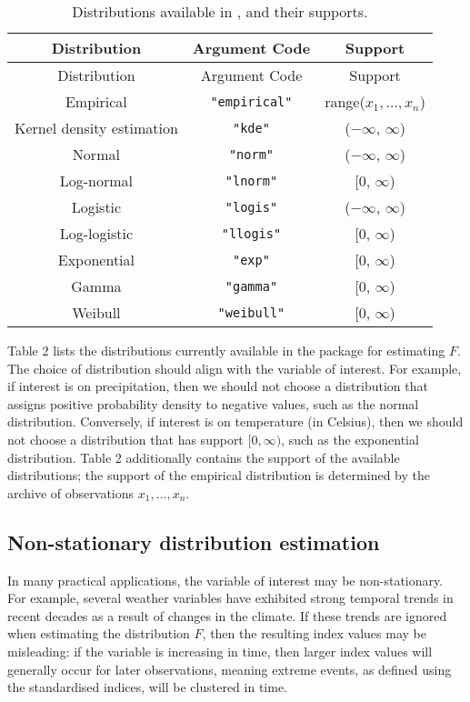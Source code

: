 \begin{longtable}[]{@{}ccc@{}}
\caption{\label{tab:unnamed-chunk-2}Distributions available in , and their supports.}\tabularnewline
\toprule\noalign{}
Distribution & Argument Code & Support \\
\midrule\noalign{}
\endfirsthead
\toprule\noalign{}
Distribution & Argument Code & Support \\
\midrule\noalign{}
\endhead
\bottomrule\noalign{}
\endlastfoot
Empirical & \texttt{"empirical"} & range(\(x_{1}, \dots, x_{n}\)) \\
Kernel density estimation & \texttt{"kde"} & (\(-\infty\), \(\infty\)) \\
Normal & \texttt{"norm"} & (\(-\infty\), \(\infty\)) \\
Log-normal & \texttt{"lnorm"} & {[}\(0\), \(\infty\)) \\
Logistic & \texttt{"logis"} & (\(-\infty\), \(\infty\)) \\
Log-logistic & \texttt{"llogis"} & {[}\(0\), \(\infty\)) \\
Exponential & \texttt{"exp"} & {[}\(0\), \(\infty\)) \\
Gamma & \texttt{"gamma"} & {[}\(0\), \(\infty\)) \\
Weibull & \texttt{"weibull"} & {[}\(0\), \(\infty\)) \\
\end{longtable}

Table 2 lists the distributions currently available in the  package for estimating \(F\). The choice of distribution should align with the variable of interest. For example, if interest is on precipitation, then we should not choose a distribution that assigns positive probability density to negative values, such as the normal distribution. Conversely, if interest is on temperature (in Celsius), then we should not choose a distribution that has support \([0, \infty)\), such as the exponential distribution. Table 2 additionally contains the support of the available distributions; the support of the empirical distribution is determined by the archive of observations \(x_{1}, \dots, x_{n}\).

\hypertarget{non-stationary-distribution-estimation}{%
\subsection{Non-stationary distribution estimation}\label{non-stationary-distribution-estimation}}

In many practical applications, the variable of interest may be non-stationary. For example, several weather variables have exhibited strong temporal trends in recent decades as a result of changes in the climate. If these trends are ignored when estimating the distribution \(F\), then the resulting index values may be misleading: if the variable is increasing in time, then larger index values will generally occur for later observations, meaning extreme events, as defined using the standardised indices, will be clustered in time.

